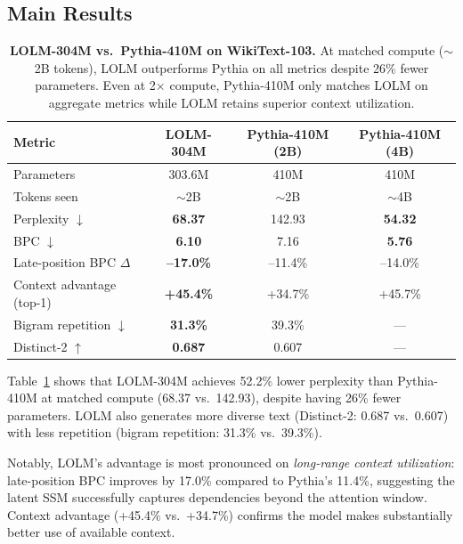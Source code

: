 \documentclass{article}
\begin{document}
\subsection{Main Results}
\label{sec:main_results}

\begin{table}[t]
\centering
\caption{\textbf{LOLM-304M vs.\ Pythia-410M on WikiText-103.} At matched
compute (${\sim}$2B tokens), LOLM outperforms Pythia on all metrics despite
26\% fewer parameters. Even at 2$\times$ compute, Pythia-410M only matches LOLM
on aggregate metrics while LOLM retains superior context utilization.}
\label{tab:main}
\vspace{0.5em}
\begin{tabular}{lccc}
\toprule
\textbf{Metric} & \textbf{LOLM-304M} & \textbf{Pythia-410M (2B)} & \textbf{Pythia-410M (4B)} \\
\midrule
Parameters & 303.6M & 410M & 410M \\
Tokens seen & $\sim$2B & $\sim$2B & $\sim$4B \\
\midrule
Perplexity $\downarrow$ & \textbf{68.37} & 142.93 & \textbf{54.32} \\
BPC $\downarrow$ & \textbf{6.10} & 7.16 & \textbf{5.76} \\
\midrule
Late-position BPC $\Delta$ & \textbf{--17.0\%} & --11.4\% & --14.0\% \\
Context advantage (top-1) & \textbf{+45.4\%} & +34.7\% & +45.7\% \\
Bigram repetition $\downarrow$ & \textbf{31.3\%} & 39.3\% & --- \\
Distinct-2 $\uparrow$ & \textbf{0.687} & 0.607 & --- \\
\bottomrule
\end{tabular}
\end{table}

Table~\ref{tab:main} shows that LOLM-304M achieves 52.2\% lower perplexity
than Pythia-410M at matched compute (68.37 vs.\ 142.93), despite having 26\%
fewer parameters. LOLM also generates more diverse text (Distinct-2: 0.687
vs.\ 0.607) with less repetition (bigram repetition: 31.3\% vs.\ 39.3\%).

Notably, LOLM's advantage is most pronounced on \emph{long-range context
utilization}: late-position BPC improves by 17.0\% compared to Pythia's 11.4\%,
suggesting the latent SSM successfully captures dependencies beyond the
attention window. Context advantage (+45.4\% vs.\ +34.7\%) confirms the model
makes substantially better use of available context.
\end{document}
